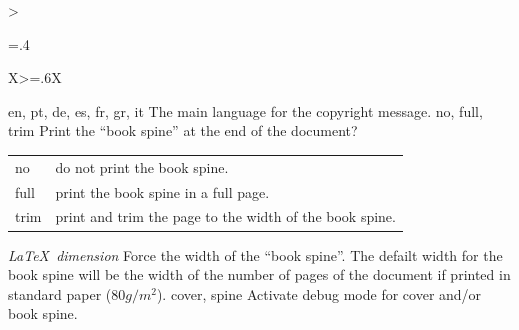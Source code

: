 \begin{xltabular}{\linewidth}{>{\hsize=.4\hsize\raggedright\arraybackslash}X>{\hsize=.6\hsize}X}
    \midrule
    {en, pt, de, es, fr, gr, it}%
    {The main language for the copyright message.}%
	{%
    }
    \midrule
    {no, full, trim}%
    {Print the “book spine” at the end of the document?}%
	{%
	    \begin{tabular}{@{}l@{ $\rightarrow$ }X@{}}
		no 		& do not print the book spine.\\
		full	& print the book spine in a full page.\\
		trim 	& print and trim the page to the width of the book spine.\\
	    \end{tabular}
    }
    \midrule
    {\emph{\LaTeX\ dimension}}%
    {Force the width of the “book spine”.}%
	{%
		 The defailt width for the book spine will be the width of the number of pages of the document if printed in standard paper ($80g/m^2$).
    }
    \midrule
    {cover, spine}%
    {Activate debug mode for cover and/or book spine.}%
	{%
    }
%
%
%
%

\end{xltabular}
